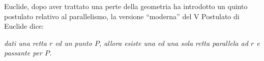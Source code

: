 \begin{comment}
 

Assumendo dunque questa come definizione di parallelismo, abbiamo 
bisogno di precisare il concetto di distanza.
Dati due punti $P$ e $Q$, la \emph{distanza} tra $P$ e $Q$ è la 
lunghezza del \emph{percorso più breve} che unisce i due punti. 
Questo concetto è valido anche se si riferisce alle distanze tra due 
città che si trovano negli stradari: sono riportate le lunghezze dei 
percorsi minimi tra tutte le strade alternative che collegano due 
città. Naturalmente, nel piano, ove si ``dispone'' di tutti i punti 
da poter ``attraversare'', il percorso più breve che collega due 
punti $P$ e $Q$ è il segmento $PQ$; quindi nella geometria euclidea 
assumiamo come distanza tra due punti la lunghezza del segmento 
avente per estremi i due punti.

Se vogliamo parlare di distanza tra due insiemi di punti, allora va 
considerato il percorso più breve tra tutti i percorsi che collegano 
un qualsiasi punto del primo insieme con un qualsiasi punto del 
secondo: in pratica la distanza è la lunghezza del più piccolo 
segmento tra tutti quelli che collegano i due insiemi di punti. 

Nel caso particolare di un punto $A$ ed una retta $BC$, se il punto 
appartiene alla retta allora la distanza di $A$ da $BC$ è uguale a 
zero, altrimenti si considera come distanza la lunghezza del segmento 
$AH$, dove $H$ è il punto in cui la perpendicolare a $BC$ passante 
per $A$ interseca la stessa retta $BC$: il motivo si intuisce in base 
a quanto detto, ma risulterà chiaro più avanti, quando affronteremo 
lo studio delle disuguaglianze tra gli elementi di un triangolo. 

Analogamente, come distanza tra due rette parallele si assume la 
lunghezza di un qualunque segmento che unisce il punto di una delle 
due rette con il piede della perpendicolare mandata da esso 
sull'altra retta. Affermare che tali segmenti sono tutti congruenti è 
un modo più preciso per dire che le due rette mantengono sempre la 
stessa distanza.
\end{comment}

Euclide, dopo aver trattato una perte della geometria ha introdotto un 
quinto postulato relativo al parallelismo, la versione 
``moderna'' del V Postulato di Euclide dice: 

\begin{postulato}
\emph{dati una retta $r$ ed un punto $P$, allora esiste una ed una 
  sola retta parallela ad $r$ e passante per $P$.}
\end{postulato}

